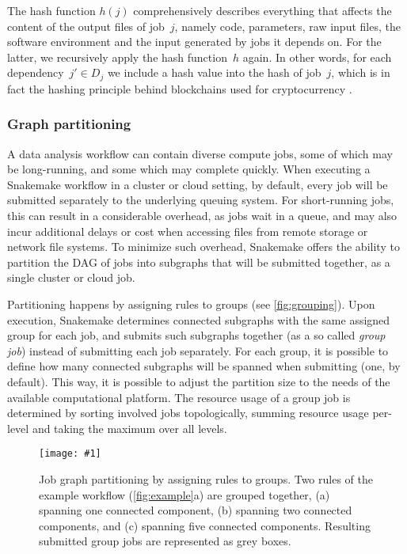 \documentclass[parskip=half]{scrartcl}
\newcommand{\image}[1]{\centering\texttt{[image: \#1]}}
\begin{document}
The hash function $h(j)$ comprehensively describes everything that affects the content of the output files of job~\(j\), namely code, parameters, raw input files, the software environment and the input generated by jobs it depends on.
For the latter, we recursively apply the hash function~\(h\) again.
In other words, for each dependency~\(j' \in D_j\) we include a hash value into the hash of job~\(j\), which is in fact the hashing principle behind blockchains used for cryptocurrency \parencite{narayanan_bitcoin_2016}.

\subsubsection{Graph partitioning}\label{sec:partitioning}

A data analysis workflow can contain diverse compute jobs, some of which may be long-running, and some which may complete quickly. When executing a Snakemake workflow in a cluster or cloud setting, by default, every job will be submitted separately to the underlying queuing system.
For short-running jobs, this can result in a considerable overhead, as jobs wait in a queue, and may also incur additional delays or cost when accessing files from remote storage or network file systems.
To minimize such overhead, Snakemake offers the ability to partition the DAG of jobs into subgraphs that will be submitted together, as a single cluster or cloud job.

Partitioning happens by assigning rules to groups (see \autoref{fig:grouping}).
Upon execution, Snakemake determines connected subgraphs with the same assigned group for each job, and submits such subgraphs together (as a so called \emph{group job}) instead of submitting each job separately.
For each group, it is  possible to define how many connected subgraphs will be spanned when submitting (one, by default).
This way, it is possible to adjust the partition size to the needs of the available computational platform.
The resource usage of a group job is determined by sorting involved jobs topologically, summing resource usage per-level and taking the maximum over all levels.

\begin{figure}
	\image{group-jobs.pdf}
	\caption{Job graph partitioning by assigning rules to groups.
		Two rules of the example workflow (\autoref{fig:example}a) are grouped together, (a) spanning one connected component, (b) spanning two connected components, and (c) spanning five connected components.
		Resulting submitted group jobs are represented as grey boxes.
	}\label{fig:grouping}
\end{figure}
\end{document}
